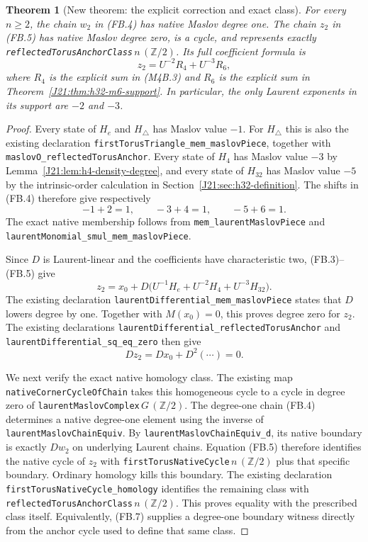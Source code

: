 \documentclass[11pt,oneside]{report}
\newtheorem{theorem}{Theorem}[section]
\theoremstyle{definition}
\numberwithin{equation}{section}
\newcommand{\decl}[1]{\textnormal{\nolinkurl{#1}}}
\begin{document}
\begin{theorem}[New theorem: the explicit correction and exact class]
\label{J21:thm:torus-second-native-cycle}
For every $n\geq2$, the chain $w_2$ in (FB.4) has native Maslov
degree one. The chain $z_2$ in (FB.5) has native Maslov degree zero,
is a cycle, and represents exactly
\decl{reflectedTorusAnchorClass}\,$n\,(\mathbb Z/2)$.
Its full coefficient formula is
\[
                         z_2=U^{-2}R_4+U^{-3}R_6,
 \tag{FB.6}
\]
where $R_4$ is the explicit sum in (M4B.3) and $R_6$ is the explicit
sum in Theorem~\ref{J21:thm:h32-m6-support}.
In particular, the only Laurent exponents in its support are
$-2$ and $-3$.
\end{theorem}
\begin{proof}
Every state of $H_e$ and $H_{\triangle}$ has Maslov value $-1$.
For $H_{\triangle}$ this is also the existing declaration
\decl{firstTorusTriangle_mem_maslovPiece}, together with
\decl{maslovO_reflectedTorusAnchor}.
Every state of $H_4$ has Maslov value $-3$ by
Lemma~\ref{J21:lem:h4-density-degree}, and every state of $H_{32}$ has
Maslov value $-5$ by the intrinsic-order calculation in
Section~\ref{J21:sec:h32-definition}.
The shifts in (FB.4) therefore give respectively
\[
                       -1+2=1,\qquad -3+4=1,\qquad -5+6=1.
\]
The exact native membership follows from
\decl{mem_laurentMaslovPiece} and
\decl{laurentMonomial_smul_mem_maslovPiece}.

Since $D$ is Laurent-linear and the coefficients have characteristic
two, (FB.3)--(FB.5) give
\[
 z_2=x_0+D\bigl(U^{-1}H_e+U^{-2}H_4+U^{-3}H_{32}\bigr).
 \tag{FB.7}
\]
The existing declaration \decl{laurentDifferential_mem_maslovPiece}
states that $D$ lowers degree by one.
Together with $M(x_0)=0$, this proves degree zero for $z_2$.
The existing declarations
\decl{laurentDifferential_reflectedTorusAnchor} and
\decl{laurentDifferential_sq_eq_zero} then give
\[
                         D z_2=D x_0+D^2(\cdots)=0.
\]

We next verify the exact native homology class.
The existing map \decl{nativeCornerCycleOfChain} takes this
homogeneous cycle to a cycle in degree zero of
\decl{laurentMaslovComplex}\,$G\,(\mathbb Z/2)$.
The degree-one chain (FB.4) determines a native degree-one element
using the inverse of \decl{laurentMaslovChainEquiv}.
By \decl{laurentMaslovChainEquiv_d}, its native boundary is exactly
$D w_2$ on underlying Laurent chains.
Equation (FB.5) therefore identifies the native cycle of $z_2$
with \decl{firstTorusNativeCycle}\,$n\,(\mathbb Z/2)$ plus that
specific boundary.
Ordinary homology kills this boundary.
The existing declaration \decl{firstTorusNativeCycle_homology}
identifies the remaining class with
\decl{reflectedTorusAnchorClass}\,$n\,(\mathbb Z/2)$.
This proves equality with the prescribed class itself.
Equivalently, (FB.7) supplies a degree-one boundary witness directly
from the anchor cycle used to define that same class.


\end{proof}
\end{document}
